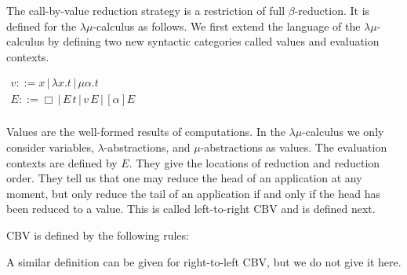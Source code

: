 The call-by-value reduction strategy is a restriction of full
$\beta$-reduction.  It is defined for the $\lambda\mu$-calculus
as follows.  We first extend the language of the $\lambda\mu$-calculus
by defining two new syntactic categories called values
and evaluation contexts.
\begin{center}
  \begin{math}
    \begin{array}{lll}
      v ::= x\,|\,\lambda x.t\,|\, \mu \alpha.t\\
      E ::= \Box\,|\,E\,t\,|\,v\,E\,|\,[\alpha]E\\
    \end{array}
  \end{math}
\end{center}
Values are the well-formed results of computations.  In the
$\lambda\mu$-calculus we only consider variables,
$\lambda$-abstractions, and $\mu$-abstractions as values.  The
evaluation contexts are defined by $E$.  They give the locations of
reduction and reduction order.  They tell us that one may reduce the
head of an application at any moment, but only reduce the tail of an
application if and only if the head has been reduced to a value.  This
is called left-to-right CBV and is defined next.
\begin{definition}
  \label{def:lamu_cbv}
  CBV is defined by the following rules:
  \begin{center}
  \end{center}
\end{definition}
\noindent
A similar definition can be given for right-to-left CBV, but we do not
give it here.  


